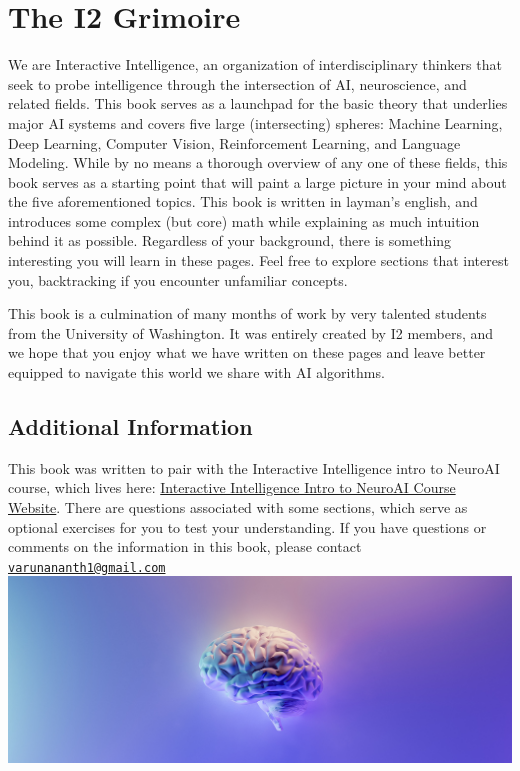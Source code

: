 \documentclass{article}
\begin{document}
\begingroup
\centering
\section*{The I2 Grimoire}
We are Interactive Intelligence, an organization of interdisciplinary thinkers that seek to probe intelligence through the intersection of AI, neuroscience, and related fields. This book serves as a launchpad for the basic theory that underlies major AI systems and covers five large (intersecting) spheres: Machine Learning, Deep Learning, Computer Vision, Reinforcement Learning, and Language Modeling. While by no means a thorough overview of any one of these fields, this book serves as a starting point that will paint a large picture in your mind about the five aforementioned topics. This book is written in layman's english, and introduces some complex (but core) math while explaining as much intuition behind it as possible. Regardless of your background, there is something interesting you will learn in these pages. Feel free to explore sections that interest you, backtracking if you encounter unfamiliar concepts. \break

This book is a culmination of many months of work by very talented students from the University of Washington. It was entirely created by I2 members, and we hope that you enjoy what we have written on these pages and leave better equipped to navigate this world we share with AI algorithms.

\subsection*{Additional Information}
This book was written to pair with the Interactive Intelligence intro to NeuroAI course, which lives here: \href{https://course.uw-i2.org/}{Interactive Intelligence Intro to NeuroAI Course Website}. There are questions associated with some sections, which serve as optional exercises for you to test your understanding. If you have questions or comments on the information in this book, please contact \href{mailto:varunananth1@gmail.com}{\texttt{varunananth1@gmail.com}} \\
\vspace{2cm}
\includegraphics[scale=0.3]{other/i2-brain.png}
\endgroup
\end{document}
